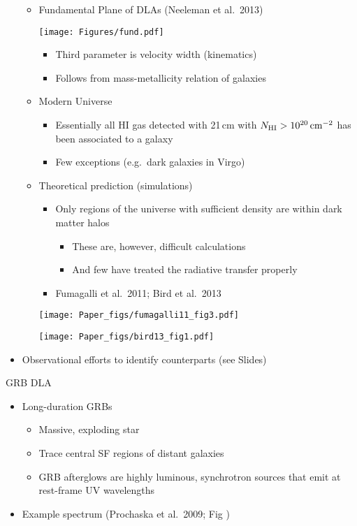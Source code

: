 \documentclass[12pt,letterpaper]{article}
\begin{document}
\begin{Aenumerate}
\begin{itemize}
\begin{itemize}
    \item Fundamental Plane of DLAs (Neeleman et al.\ 2013)

\texttt{[image: Figures/fund.pdf]}

      \begin{itemize}
      \item Third parameter is velocity width (kinematics)
      \item Follows from mass-metallicity relation of galaxies
      \end{itemize}

    \item Modern Universe
      \begin{itemize}
      \item Essentially all HI gas detected with 21\,cm with 
      $N_{\rm HI} > 10^{20} \, {\rm cm^{-2}}$ has been associated to a galaxy
      \item Few exceptions (e.g.\ dark galaxies in Virgo)
      \end{itemize}

    \item Theoretical prediction (simulations)
      \begin{itemize}
      \item Only regions of the universe with sufficient density
      are within dark matter halos
        \begin{itemize}
        \item These are, however, difficult calculations
        \item And few have treated the radiative transfer properly
        \end{itemize}
      \item Fumagalli et al.\ 2011; Bird et al.\ 2013
      \end{itemize}

\texttt{[image: Paper\_figs/fumagalli11\_fig3.pdf]}

\texttt{[image: Paper\_figs/bird13\_fig1.pdf]}

    \end{itemize}
  \item Observational efforts to identify counterparts (see Slides)
  \end{itemize}

{\bf \item GRB DLA}
  \begin{itemize}
  \item Long-duration GRBs
    \begin{itemize}
    \item Massive, exploding star
    \item Trace central SF regions of distant galaxies
    \item GRB afterglows are highly luminous, synchrotron sources
    that emit at rest-frame UV wavelengths
    \end{itemize}
  \item Example spectrum (Prochaska et al.\ 2009; Fig )


\end{itemize}
\end{Aenumerate}
\end{document}
